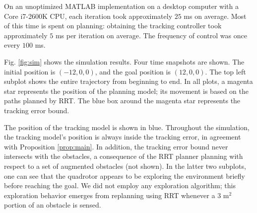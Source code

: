 On an unoptimized MATLAB implementation on a desktop computer with a Core i7-2600K CPU, each iteration took approximately $25$ ms on average. Most of this time is spent on planning: obtaining the tracking controller took approximately $5$ ms per iteration on average. The frequency of control was once every $100$ ms.

Fig. \ref{fig:sim} shows the simulation results. Four time snapshots are shown. The initial position is $(-12, 0, 0)$, and the goal position is $(12, 0, 0)$. The top left subplot shows the entire trajectory from beginning to end. In all plots, a magenta star represents the position of the planning model; its movement is based on the paths planned by RRT. The blue box around the magenta star represents the tracking error bound.

The position of the tracking model is shown in blue. Throughout the simulation, the tracking model's position is always inside the tracking error, in agreement with Proposition \ref{prop:main}. In addition, the tracking error bound never intersects with the obstacles, a consequence of the RRT planner planning with respect to a set of augmented obstacles (not shown). In the latter two subplots, one can see that the quadrotor appears to be exploring the environment briefly before reaching the goal. We did not employ any exploration algorithm; this exploration behavior emerges from replanning using RRT whenever a $3$ m$^2$ portion of an obstacle is sensed.